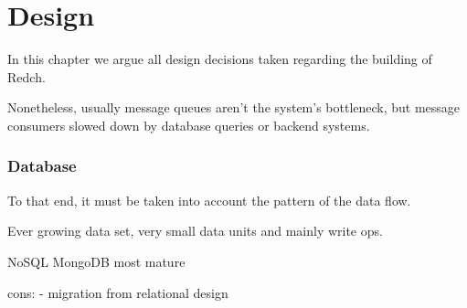\chapter{Design}

In this chapter we argue all design decisions taken regarding the building of Redch. 

Nonetheless, usually message queues aren't the system's bottleneck, but message consumers slowed down by database queries or backend systems.

\subsection{Database}

To that end, it must be taken into account the pattern of the data flow.
  
Ever growing data set, very small data units and mainly write ops.


NoSQL
MongoDB most mature

cons: 
- migration from relational design
